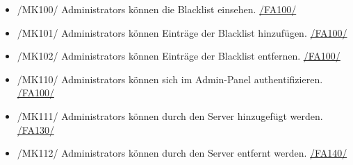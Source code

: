 \begin{itemize}
\begin{itemize}
            \item{/MK94/} \label{/MK94/}Welche \Glspl{Alias} hat das Gebäude/der Raum? \hyperref[/FA80/]{/FA80/}
        \end{itemize}
    \item{/MK100/} \label{/MK100/}\Glspl{Administrator} können die \Gls{Blacklist} einsehen. \hyperref[/FA100/]{/FA100/}
    \item{/MK101/} \label{/MK101/}\Glspl{Administrator} können Einträge der \Gls{Blacklist} hinzufügen. \hyperref[/FA100/]{/FA100/}
    \item{/MK102/} \label{/MK102/}\Glspl{Administrator} können Einträge der \Gls{Blacklist} entfernen. \hyperref[/FA100/]{/FA100/}
    \item{/MK110/} \label{/MK110/}\Glspl{Administrator} können sich im \Gls{Admin-Panel} authentifizieren. \hyperref[/FA100/]{/FA100/}
    \item{/MK111/} \label{/MK111/}\Glspl{Administrator} können durch den \Gls{Server} hinzugefügt werden. \hyperref[/FA130/]{/FA130/}
    \item{/MK112/} \label{/MK112/}\Glspl{Administrator} können durch den \Gls{Server} entfernt werden. \hyperref[/FA140/]{/FA140/}

\end{itemize}
